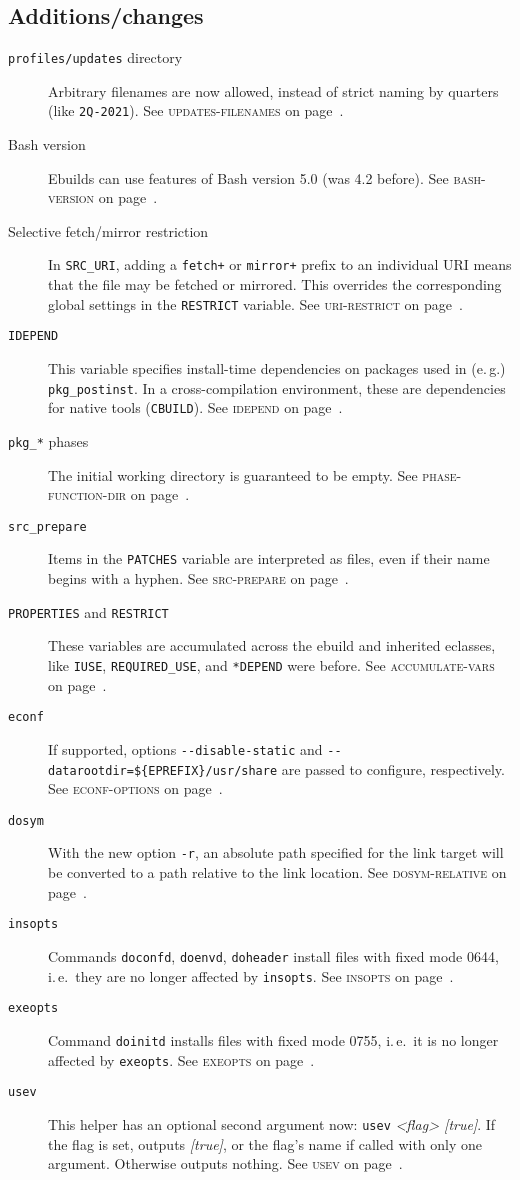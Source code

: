 \documentclass[a4paper,nofoldmark]{leaflet}
\newcommand{\code}[1]{\texttt{#1}}
\newcommand{\featureref}[1]{\textsc{#1} on page~\pageref{feat:#1}}
\begin{document}
\subsection{Additions/changes}
\label{sec:cs:eapi8-additions}
\begin{description}
    \item[\code{profiles/updates} directory] Arbitrary filenames
    are now allowed, instead of strict naming by quarters
    (like \code{2Q-2021}). See \featureref{updates-filenames}.
    \item[Bash version] Ebuilds can use features of Bash version 5.0
    (was 4.2 before). See \featureref{bash-version}.
    \item[Selective fetch/mirror restriction] In \code{SRC_URI},
    adding a \code{fetch+} or \code{mirror+} prefix to an individual
    URI means that the file may be fetched or mirrored. This overrides
    the corresponding global settings in the \code{RESTRICT} variable.
    See \featureref{uri-restrict}.
    \item[\code{IDEPEND}] This variable specifies install-time
    dependencies on packages used in (e.\,g.) \code{pkg_postinst}.
    In a cross-compilation environment, these are dependencies for
    native tools (\code{CBUILD}). See \featureref{idepend}.
    \item[\code{pkg_*} phases] The initial working directory is
    guaranteed to be empty. See \featureref{phase-function-dir}.
    \item[\code{src_prepare}] Items in the \code{PATCHES} variable are
    interpreted as files, even if their name begins with a hyphen.
    See \featureref{src-prepare}.
    \item[\code{PROPERTIES} and \code{RESTRICT}] These variables are
    accumulated across the ebuild and inherited eclasses, like
    \code{IUSE}, \code{REQUIRED\_USE}, and \code{*DEPEND} were before.
    See \featureref{accumulate-vars}.
    \item[\code{econf}] If supported, options
    \code{-{}-disable-static} and
    \code{-{}-datarootdir=\$\{EPREFIX\}/usr/share} are passed
    to configure, respectively. See \featureref{econf-options}.
    \item[\code{dosym}] With the new option \code{-r}, an absolute
    path specified for the link target will be converted to a path
    relative to the link location. See \featureref{dosym-relative}.
    \item[\code{insopts}] Commands \code{doconfd}, \code{doenvd},
    \code{doheader} install files with fixed mode 0644, i.\,e.\
    they are no longer affected by \code{insopts}.
    See \featureref{insopts}.
    \item[\code{exeopts}] Command \code{doinitd} installs files
    with fixed mode 0755, i.\,e.\ it is no longer affected by
    \code{exeopts}. See \featureref{exeopts}.
    \item[\code{usev}] This helper has an optional second argument
    now: \code{usev} \emph{<flag> [true]}. If the flag is set,
    outputs \emph{[true]}, or the flag's name if called with only one
    argument. Otherwise outputs nothing. See \featureref{usev}.
\end{description}
\end{document}
